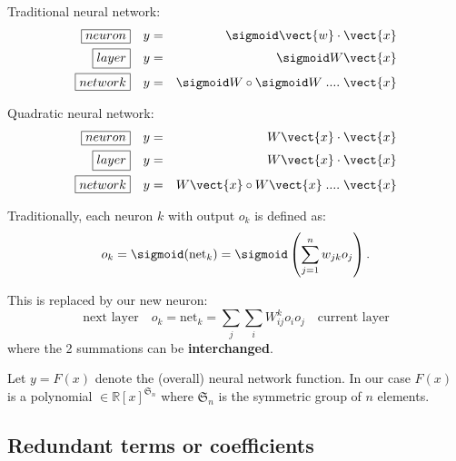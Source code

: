Traditional neural network:
\begin{eqnarray}
\boxed{neuron} \quad & y = & \sigmoid \vect{w} \cdot \vect{x} \nonumber \\
\boxed{layer} \quad & y = & \sigmoid W \vect{x} \nonumber \\
\boxed{network} \quad & y = & \sigmoid W \circ \sigmoid W \; .... \; \vect{x} 
\end{eqnarray}

Quadratic neural network:
\begin{eqnarray}
\boxed{neuron} \quad & y = & W \vect{x} \cdot \vect{x} \nonumber \\
\boxed{layer} \quad & y = & W \vect{x} \cdot \vect{x} \nonumber \\
\boxed{network} \quad & y = & W \vect{x} \circ W \vect{x} \; .... \; \vect{x} 
\end{eqnarray}

Traditionally, each neuron $k$ with output $o_k$ is defined as:
\begin{equation}
o_k = \sigmoid ({\text{net}}_k) = \sigmoid \left(\sum _{j=1}^{n} w_{jk} o_j \right) .
\end{equation}

This is replaced by our new neuron:
\begin{equation}
\boxed{\mbox{next layer}} \quad
o_k = {\text{net}}_k = \sum_j \sum_i W_{ij}^k o_i o_j
\quad \boxed{\mbox{current layer}}
\end{equation}
where the 2 summations can be \textbf{interchanged}.

Let $y = F(x)$ denote the (overall) neural network function.  In our case $F(x)$ is a polynomial $\in \mathbb{R}[x]^{\mathfrak{S}_n}$ where $\mathfrak{S}_n$ is the symmetric group of $n$ elements.

\subsection{Redundant terms or coefficients}

